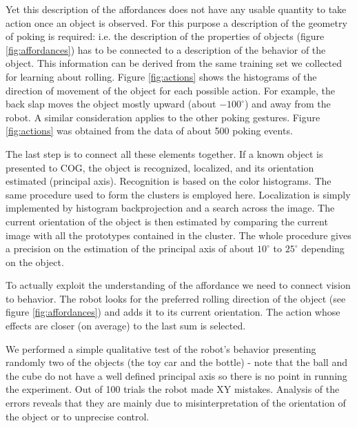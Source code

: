 Yet this description of the affordances does not have any usable quantity to 
take action once an object is observed. For this purpose a description of 
the geometry of poking is required: i.e. the description of the properties of 
objects (figure \ref{fig:affordances}) has to be connected to a description
of the behavior of the object. 
This information can be derived from the same training set we collected for learning
about rolling. Figure \ref{fig:actions} shows the histograms of the direction 
of movement of the object for
each possible action. For example, the back slap moves the object mostly upward
(about $-100^\circ$) and away from the robot. A similar consideration applies
to the other poking gestures. Figure \ref{fig:actions} was obtained from the data of
about 500 poking events.

The last step is to connect all these elements together. If a known object is
presented to COG, the object is recognized, localized, and
its orientation estimated (principal axis). Recognition is based on the color histograms. The same
procedure used to form the clusters is employed here. Localization is simply implemented 
by histogram backprojection and a search across the image. The current orientation of the
object is then estimated by comparing the current image with all the prototypes 
contained in the cluster. The whole procedure gives a precision on the estimation
of the principal axis of about $10^\circ$ to $25^\circ$ depending on the object.  

To actually exploit the understanding of the affordance we need to connect vision to 
behavior. The robot looks for the preferred rolling direction of the object
(see figure \ref{fig:affordances}) and adds it to its current orientation. 
The action whose effects are closer (on average) to the last sum is selected.

We performed a simple qualitative test of the robot's behavior presenting randomly
two of the objects (the toy car and the bottle) - note that the ball and the cube 
do not have a well defined principal axis so there is no point in running the 
experiment. Out of 100 trials the robot made XY mistakes. Analysis 
of the errors reveals that they are mainly due to misinterpretation of the 
orientation of the object or to unprecise control.


